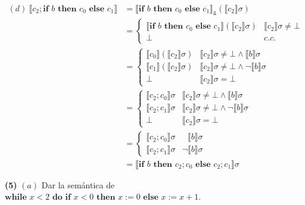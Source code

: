 \documentclass[article, 12pt]{article}
\begin{document}
~

\begin{align*}
  (d) ~ \llbracket c_2;\textbf{if } b \textbf{ then } c_0 \textbf{ else } c_1 \rrbracket 
  &= \llbracket \textbf{if } b \textbf{ then } c_0 \textbf{ else } c_1
  \rrbracket_{\Bot} \left( \llbracket c_2 \rrbracket \sigma \right)  \\ 
  &= \begin{cases}
    \llbracket \textbf{if } b \textbf{ then } c_0 \textbf{ else } c_1 \rrbracket
    \left( \llbracket c_2 \rrbracket \sigma\right) & \llbracket c_2 \rrbracket
    \sigma \neq \bot  \\ 
    \bot & c.c.
  \end{cases} \\ 
  &= \begin{cases}
    \llbracket c_0 \rrbracket \left( \llbracket c_2 \rrbracket \sigma \right) &
    \llbracket c_2 \rrbracket \sigma \neq \bot \land \llbracket b \rrbracket
    \sigma \\
    \llbracket c_1 \rrbracket \left( \llbracket c_2 \rrbracket \sigma \right) &
    \llbracket c_2 \rrbracket \sigma \neq \bot \land \neg \llbracket b
    \rrbracket \sigma \\ 
    \bot  & \llbracket c_2 \rrbracket\sigma = \bot 
  \end{cases} \\ 
  &= \begin{cases}
    \llbracket c_2;c_0 \rrbracket \sigma &
    \llbracket c_2 \rrbracket \sigma \neq \bot \land \llbracket b \rrbracket
    \sigma \\
    \llbracket c_2;c_1 \rrbracket \sigma &
    \llbracket c_2 \rrbracket \sigma \neq \bot \land \neg \llbracket b
    \rrbracket \sigma \\ 
    \bot  & \llbracket c_2 \rrbracket\sigma = \bot 
  \end{cases} \\ 
  &=\begin{cases}
    \llbracket c_2;c_0 \rrbracket \sigma & ~~~\llbracket b \rrbracket \sigma \\ 
    \llbracket c_2;c_1 \rrbracket \sigma & \neg \llbracket b \rrbracket \sigma
  \end{cases} \\ 
  &= \llbracket \textbf{if } b \textbf{ then } c_2;c_0 \textbf{ else } c_2;c_1
  \rrbracket \sigma
\end{align*}

\pagebreak 

\begin{myframe}
\textbf{(5)} $(a)$ Dar la semántica de $\textbf{while } x < 2 \textbf{ do }  \textbf{if } x <
0\textbf{ then } x := 0 \textbf{ else } x := x + 1$. 
\end{myframe}
\end{document}
